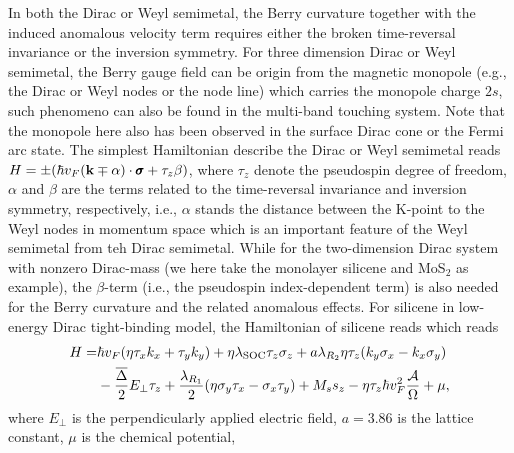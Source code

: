 \documentclass[UTF8,a4paper]{article}
\begin{document}
\begin{large}
In both the Dirac or Weyl semimetal, the Berry curvature together with the induced anomalous velocity term 
requires either the broken time-reversal invariance or the inversion symmetry\cite{Wu S}.
For three dimension Dirac or Weyl semimetal,
the Berry gauge field can be origin from the magnetic monopole (e.g., the Dirac or Weyl nodes or the node line) 
which carries the monopole charge $2s$\cite{Wu C HX},
such phenomeno can also be found in the multi-band touching system\cite{Ezawa M}.
Note that the monopole here also has been observed in the surface Dirac cone or the Fermi arc state\cite{Li R}.
The simplest Hamiltonian describe the Dirac or Weyl semimetal reads $H=\pm(\hbar v_{F}({\bf k}\mp \alpha)\cdot{\pmb \sigma}+\tau_{z}\beta)$,
where $\tau_{z}$ denote the pseudospin degree of freedom, $\alpha$ and $\beta$ are the terms related to the time-reversal invariance and inversion symmetry,
respectively,
i.e.,
$\alpha$ stands the distance between the K-point to the Weyl nodes in momentum space\cite{Lv M,Chang H R2}
which is an important feature of the Weyl semimetal from teh Dirac semimetal.
While for the two-dimension Dirac system with nonzero Dirac-mass (we here take the monolayer silicene and MoS$_{2}$ as example),
the $\beta$-term (i.e., the pseudospin index-dependent term) is also needed for the Berry curvature and the related anomalous effects\cite{Wu C HX}.
For silicene in low-energy Dirac tight-binding model,
the Hamiltonian of silicene reads
which reads\cite{Wu C HX,Wu C H3,Wu C H1,Wu C H4,Wu C H7,XX,Wu C H_3}
\begin{equation} 
\begin{aligned}
H=&\hbar v_{F}(\eta\tau_{x}k_{x}+\tau_{y}k_{y})+\eta\lambda_{{\rm SOC}}\tau_{z}\sigma_{z}+a\lambda_{R_{2}}\eta\tau_{z}(k_{y}\sigma_{x}-k_{x}\sigma_{y})\\
&-\frac{\overline{\Delta}}{2}E_{\perp}\tau_{z}+\frac{\lambda_{R_{1}}}{2}(\eta\sigma_{y}\tau_{x}-\sigma_{x}\tau_{y})+M_{s}s_{z}
-\eta\tau_{z}\hbar v_{F}^{2}\frac{\mathcal{A}}{\Omega}+\mu,
\end{aligned}
\end{equation}
where 
$E_{\perp}$ is the perpendicularly applied electric field, 
$a=3.86$ is the lattice constant,
$\mu$ is the chemical potential,

\end{large}
\end{document}
